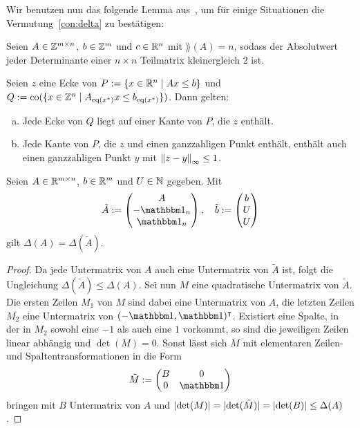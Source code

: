 Wir benutzen nun das folgende Lemma aus~\cite[Theorem 2 und Beweis]{VESELOV2009220}, um für einige Situationen die Vermutung~\ref{con:delta} zu bestätigen:
\begin{lemma}\label{lem:veselov}
	Seien $A\in\mathbb{Z}^{m\times n}$, $b\in\mathbb{Z}^m$ und $c\in\mathbb{R}^n$ mit $\rang(A)=n$, sodass der Absolutwert jeder Determinante einer $n\times n$ Teilmatrix kleinergleich 2 ist.
	
	Seien $z$ eine Ecke von $P:=\{x\in\mathbb{R}^n\mid Ax\leq b \}$ und $Q:=\operatorname{co}(\{x\in\mathbb{Z}^n \mid A_{\operatorname{eq}(x^*)}x \leq b_{\operatorname{eq}(x^*)} \})$.
	Dann gelten:
	\begin{enumerate}[(a)]
		\item Jede Ecke von $Q$ liegt auf einer Kante von $P$, die $z$ enthält.
		\item Jede Kante von $P$, die $z$ und einen ganzzahligen Punkt enthält, enthält auch einen ganzzahligen Punkt $y$ mit $\left\lVert z -y\right\rVert_\infty\leq 1$.
	\end{enumerate}
\end{lemma}
\begin{lemma}\label{lem:bounded}
	Seien $A\in\mathbb{R}^{m\times n}$, $b\in\mathbb{R}^m$ und $U\in\mathbb{N}$ gegeben.
	Mit $$
		\tilde{A}:=
		\begin{pmatrix} A \\ -\one_n \\ \one_n \end{pmatrix},\quad
		\tilde{b}:=\begin{pmatrix} b \\ U \\ U \end{pmatrix}
	$$
	gilt $\Delta(A)=\Delta(\tilde{A})$.
\end{lemma}
\begin{proof}
	Da jede Untermatrix von $A$ auch eine Untermatrix von $\tilde{A}$ ist, folgt die Ungleichung $\Delta(\tilde{A})\leq\Delta(A)$.
	Sei nun $M$ eine quadratische Untermatrix von $\tilde{A}$.
	Die ersten Zeilen $M_1$ von $M$ sind dabei eine Untermatrix von $A$, die letzten Zeilen $M_2$ eine Untermatrix von $(-\one, \one)\transpose$.
	Existiert eine Spalte, in der in $M_2$ sowohl eine $-1$ als auch eine $1$ vorkommt, so sind die jeweiligen Zeilen linear abhängig und $\det(M)=0$.
	Sonst lässt sich $M$ mit elementaren Zeilen- und Spaltentransformationen in die Form $$\tilde{M}:= \begin{pmatrix}
		B & 0 \\
		0 & \one
	\end{pmatrix}$$ bringen mit $B$ Untermatrix von $A$ und $\lvert \det(M) \rvert=\lvert \det(\tilde{M}) \rvert=\lvert \det(B) \rvert\leq\Delta(A)$.
\end{proof}

